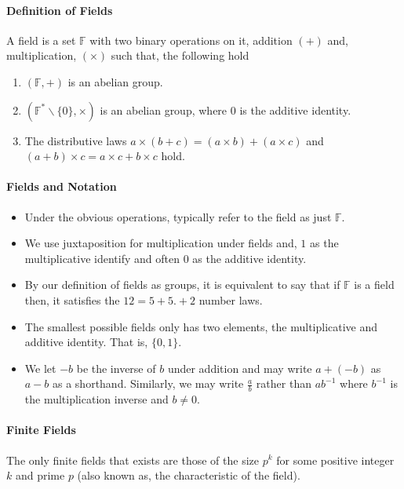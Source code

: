 \paragraph{Definition of Fields}
A field is a set \(\mathbb{F}\) with two binary operations on it,
addition \((+)\) and, multiplication, \((\times)\) such that, the following
hold
\begin{enumerate}
    \item \((\mathbb{F}, +)\) is an abelian group.
    \item \((\mathbb{F}^*\backslash \{0\}, \times)\) is an abelian group, where
    \(0\) is the additive identity.
    \item The distributive laws \(a\times (b+c) = (a\times b) + (a\times c)\)
    and \((a+b)\times c = a\times c + b\times c\) hold.
\end{enumerate}


\paragraph{Fields and Notation}
\begin{itemize}
    \item Under the obvious operations, typically refer to the field as
    just \(\mathbb{F}\).
    \item We use juxtaposition for multiplication under fields and, \(1\) as
    the multiplicative identify and often \(0\) as the additive identity.
    \item By our definition of fields as groups, it is equivalent to say
    that if \(\mathbb{F}\) is a field then, it satisfies the 
    \(12 = 5 + 5 . + 2\) number laws.
    \item The smallest possible fields only has two elements, the
    multiplicative and additive identity. That is, \(\{0, 1\}\).
    \item We let \(-b\) be the inverse of \(b\) under addition and may write
    \(a + (-b)\) as \(a - b\) as a shorthand. Similarly, we may write
    \(\frac{a}{b}\) rather than \(ab^{-1}\) where \(b^{-1}\) is the
    multiplication inverse and \(b\neq 0\).
\end{itemize}

\paragraph{Finite Fields}
The only finite fields that exists are those of the size \(p^k\) for some
positive integer \(k\)  and prime \(p\) (also known as, the characteristic
of the field).

